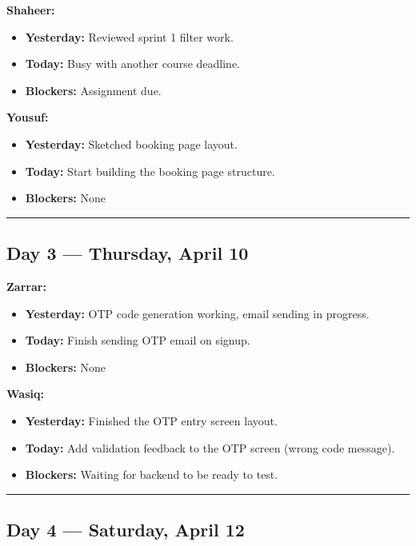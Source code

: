 \documentclass[12pt,a4paper]{article}
\begin{document}
\textbf{Shaheer:}
\begin{itemize}[noitemsep]
    \item \textbf{Yesterday:} Reviewed sprint 1 filter work.
    \item \textbf{Today:} Busy with another course deadline.
    \item \textbf{Blockers:} Assignment due.
\end{itemize}

\textbf{Yousuf:}
\begin{itemize}[noitemsep]
    \item \textbf{Yesterday:} Sketched booking page layout.
    \item \textbf{Today:} Start building the booking page structure.
    \item \textbf{Blockers:} None
\end{itemize}

\vspace{1em}\hrule\vspace{1em}

\subsection*{Day 3 --- Thursday, April 10}

\textbf{Zarrar:}
\begin{itemize}[noitemsep]
    \item \textbf{Yesterday:} OTP code generation working, email sending in progress.
    \item \textbf{Today:} Finish sending OTP email on signup.
    \item \textbf{Blockers:} None
\end{itemize}

\textbf{Wasiq:}
\begin{itemize}[noitemsep]
    \item \textbf{Yesterday:} Finished the OTP entry screen layout.
    \item \textbf{Today:} Add validation feedback to the OTP screen (wrong code message).
    \item \textbf{Blockers:} Waiting for backend to be ready to test.
\end{itemize}

\vspace{1em}\hrule\vspace{1em}

\subsection*{Day 4 --- Saturday, April 12}
\end{document}
